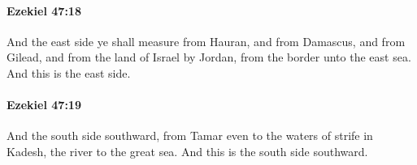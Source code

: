 		\paragraph{Ezekiel 47:18} %
			\label{EZEKIEL-47-18}

			And the east side ye shall measure from Hauran, and from Damascus, and from Gilead, and from the land of Israel by Jordan, from the border unto the east sea. And this is the east side.


		\paragraph{Ezekiel 47:19} %
			\label{EZEKIEL-47-19}

			And the south side southward, from Tamar even to the waters of strife in Kadesh, the river to the great sea. And this is the south side southward.


